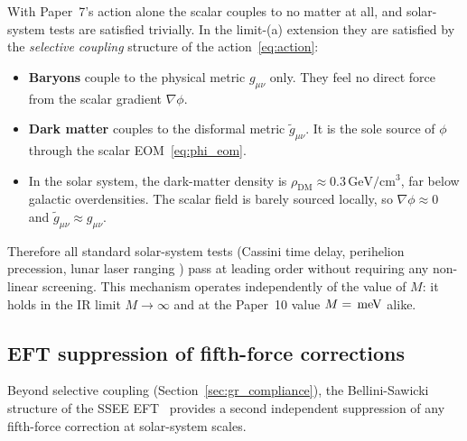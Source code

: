 \documentclass[12pt,a4paper]{article}
\begin{document}
With Paper~7's action alone the scalar couples to no matter at all, and
solar-system tests are satisfied trivially. In the limit-(a) extension they are
satisfied by the \emph{selective coupling} structure of the action~\eqref{eq:action}:
\begin{itemize}
  \item \textbf{Baryons} couple to the physical metric $g_{\mu\nu}$ only.
        They feel no direct force from the scalar gradient $\nabla\phi$.
  \item \textbf{Dark matter} couples to the disformal metric $\tilde{g}_{\mu\nu}$.
        It is the sole source of $\phi$ through the scalar EOM~\eqref{eq:phi_eom}.
  \item In the solar system, the dark-matter density is
        $\rho_{\mathrm{DM}} \approx 0.3\,\mathrm{GeV/cm^3}$, far below galactic
        overdensities. The scalar field is barely sourced locally, so
        $\nabla\phi \approx 0$ and $\tilde{g}_{\mu\nu} \approx g_{\mu\nu}$.
\end{itemize}
Therefore all standard solar-system tests (Cassini time delay, perihelion
precession, lunar laser ranging \citep{will2014}) pass at leading order without
requiring any non-linear screening.
This mechanism operates independently of the value of $M$: it holds in the
IR limit $M\to\infty$ and at the Paper~10 value $M = \val{M_meV_d2}\,\mathrm{meV}$ alike.

\subsection{EFT suppression of fifth-force corrections}
\label{sec:double_protection}

Beyond selective coupling (Section~\ref{sec:gr_compliance}), the Bellini-Sawicki
structure of the SSEE EFT~\citep{Bellini2015,ssee_paper7} provides a second
independent suppression of any fifth-force correction at solar-system scales.
\end{document}
